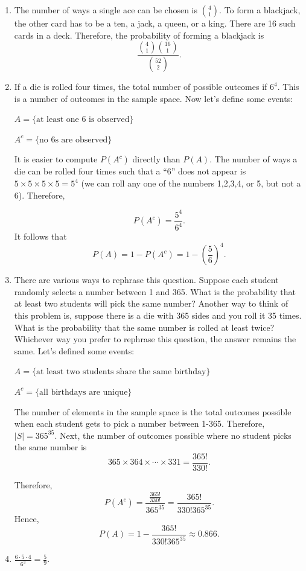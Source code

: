 \documentclass[
  12pt,
]{krantzNoCorner}
\begin{document}
\begin{enumerate}
\def\labelenumi{\arabic{enumi}.}
\item
  The number of ways a single ace can be chosen is \(\binom{4}{1}.\) To
  form a blackjack, the other card has to be a ten, a jack, a queen,
  or a king. There are 16 such cards in a deck. Therefore, the
  probability of forming a blackjack is
  \[\frac{\binom{4}{1}\binom{16}{1}}{\binom{52}{2}}.\]
\item
  If a die is rolled four times, the total number of possible outcomes
  if \(6^4.\) This is a number of outcomes in the sample space.
  Now let's define some events:

  \(A=\{\mbox{at least one 6 is observed}\}\)

  \(A^c=\{\mbox{no 6s are observed}\}\)

  It is easier to compute \(P(A^c)\) directly than \(P(A).\) The number of
  ways a die can be rolled four times such that a ``6'' does not appear
  is \(5\times 5\times 5\times 5 = 5^4\) (we can roll any one of the
  numbers 1,2,3,4, or 5, but not a 6). Therefore,

  \[P(A^c)=\frac{5^4}{6^4}.\]It follows that
  \[P(A)=1-P(A^c)=1-\left(\frac{5}{6}\right)^4.\]
\item
  There are various ways to rephrase this question. Suppose each
  student randomly selects a number between 1 and 365. What is the
  probability that at least two students will pick the same number?
  Another way to think of this problem is, suppose there is a die with
  365 sides and you roll it 35 times. What is the probability that the
  same number is rolled at least twice? Whichever way you prefer to
  rephrase this question, the answer remains the same. Let's defined
  some events:

  \(A=\{\mbox{at least two students share the same birthday}\}\)

  \(A^c=\{\mbox{all birthdays are unique}\}\)

  The number of elements in the sample space is the total outcomes
  possible when each student gets to pick a number between 1-365.
  Therefore, \(|S|=365^{35}.\) Next, the number of outcomes possible
  where no student picks the same number is
  \[365\times 364\times\cdots\times 331 = \frac{365!}{330!}.\]

  Therefore,
  \[P(A^c)=\frac{\frac{365!}{330!}}{365^{35}}=\frac{365!}{330!365^{35}}.\]
  Hence, \[P(A)=1-\frac{365!}{330!365^{35}}\approx 0.866.\]
\item
  \(\frac{6\cdot 5\cdot 4}{6^3}= \frac{5}{9}.\)
\end{enumerate}
\end{document}
